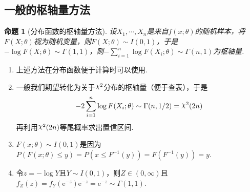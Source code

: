 \documentclass[12pt, a4paper, oneside]{ctexart}
\newtheorem{proposition}[theorem]{命题}
\numberwithin{equation}{section}  %
\newenvironment{remark}{\begin{enumerate}[label=\textbf{注\arabic*.}]}{\end{enumerate}}
\let\leq=\leqslant %
\DeclareRobustCommand{\rchi}{{\mathpalette\irchi\relax}}
\newcommand{\irchi}[2]{\raisebox{\depth}{$#1\chi$}} %
\def\e{\mathrm{e}}          %
\begin{document}
\subsection{一般的枢轴量方法}
\begin{proposition}[分布函数的枢轴量方法]
    设$X_1,\cdots,X_n$是来自$f(x;\theta)$的随机样本，将$F(X;\theta)$视为随机变量，则$F(X;\theta)\sim I(0,1)$，于是$-\log F(X;\theta)\sim\Gamma(1,1)$，则$-\sum_{i=1}^n\log F(X_i;\theta)\sim \Gamma(n,1)$为枢轴量.
\end{proposition}
\begin{remark}
    \item 上述方法在分布函数便于计算时可以使用.
    \item 一般我们期望转化为关于$\rchi^2$分布的枢轴量（便于查表），于是
    \begin{equation*}
        -2\sum_{i=1}^n\log F(X_i;\theta)\sim\Gamma(n,1/2) = \rchi^2(2n)   
    \end{equation*}
    再利用$\rchi^2(2n)$等尾概率求出置信区间.
    \item $F(x;\theta)\sim I(0,1)$是因为$P(F(x;\theta)\leq y) = P(x\leq F^{-1}(y))=F(F^{-1}(y))=y$.
    \item 令$z=-\log Y$且$Y\sim I(0,1)$，则$Z\in(0,\infty)$且$f_Z(z)=f_Y(\e^{-z})\e^{-z}=\e^{-z}\sim\Gamma(1,1)$.
\end{remark}
\end{document}
